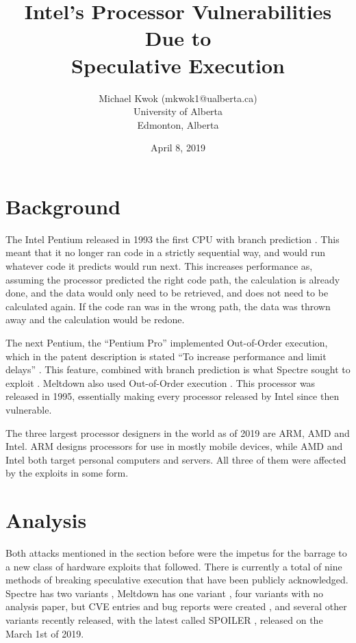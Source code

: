 \documentclass[12pt]{article}
\title{Intel's Processor Vulnerabilities Due to \\ Speculative Execution}
\author{Michael Kwok (mkwok1@ualberta.ca) \\ University of Alberta \\ Edmonton, Alberta}
\date{April 8, 2019}
\begin{document}
\clearpage\maketitle
\thispagestyle{empty}

\pagebreak

\section*{Background}

The Intel Pentium released in 1993 the first CPU with branch prediction \cite{Intel:Pentium}. This meant that it no longer ran code in a strictly sequential way, and would run whatever code it predicts would run next. This increases performance as, assuming the processor predicted the right code path, the calculation is already done, and the data would only need to be retrieved, and does not need to be calculated again. If the code ran was in the wrong path, the data was thrown away and the calculation would be redone.

The next Pentium, the ``Pentium Pro'' implemented Out-of-Order execution, which in the patent description is stated ``To increase performance and limit delays'' \cite{Patents:OutOfOrder}. This feature, combined with branch prediction is what Spectre sought to exploit \cite[Sec.~1]{Paper:Spectre}. Meltdown also used Out-of-Order execution \cite{Paper:Meltdown}. This processor was released in 1995, essentially making every processor released by Intel since then vulnerable.

The three largest processor designers in the world as of 2019 are ARM, AMD and Intel. ARM designs processors for use in mostly mobile devices, while AMD and Intel both target personal computers and servers. All three of them were affected by the exploits in some form.

\section*{Analysis}

Both attacks mentioned in the section before were the impetus for the barrage to a new class of hardware exploits that followed. There is currently a total of nine methods of breaking speculative execution that have been publicly acknowledged. Spectre has two variants \cite[Sec.~1.2]{Paper:Spectre}, Meltdown has one variant \cite{Paper:Meltdown}, four variants with no analysis paper, but CVE entries and bug reports were created \cite{Heise:SpectreNG}, and several other variants recently released, with the latest called SPOILER \cite{Paper:SPOILER}, released on the March 1st of 2019.
\end{document}
